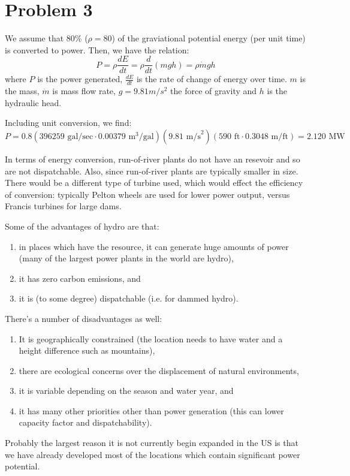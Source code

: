 \documentclass{homework}
\begin{document}
\section{Problem 3}

\begin{letterenum}
\item We assume that 80\% ($\rho = 80$) of the graviational potential energy
    (per unit time) is converted to power. Then, we have the relation:
    \begin{equation*}
        P = \rho \frac{dE}{dt} = \rho \frac{d}{dt}(mgh) = \rho \dot{m}gh
    \end{equation*}
    where $P$ is the power generated, $\frac{dE}{dt}$ is the rate of change
    of energy over time. $m$ is the mass, $\dot{m}$ is mass flow rate, $g=9.81m/s^2$
    the force of gravity and $h$ is the hydraulic head.

    Including unit conversion, we find:
    \begin{equation*}
        P = 0.8 (396259 \text{ gal/sec} \cdot 0.00379 \text{ m}^3\text{/gal})
            (9.81 \text{ m/s}^2) (590 \text{ ft} \cdot 0.3048 \text{ m/ft})
            = \boxed{2.120 \text{ MW}}
    \end{equation*}

\item In terms of energy conversion, run-of-river plants do not have an
    resevoir and so are not dispatchable. Also, since run-of-river plants
    are typically smaller in size. There would be a different
    type of turbine used, which would effect the efficiency of conversion:
    typically Pelton wheels are used for lower power output, versus
    Francis turbines for large dams.
\item Some of the advantages of hydro are that:
\begin{enumerate}
    \item in places which have the resource, it can generate huge amounts
        of power (many of the largest power plants in the world are hydro),
    \item it has zero carbon emissions, and
    \item it is (to some degree) dispatchable (i.e. for dammed hydro).
\end{enumerate}
There's a number of disadvantages as well:
\begin{enumerate}
    \item It is geographically constrained (the location needs to have
        water and a height difference such as mountains),
    \item there are ecological concerns over the displacement of natural
        environments,
    \item it is variable depending on the season and water year, and
    \item it has many other priorities other than power generation (this can
        lower capacity factor and dispatchability).
\end{enumerate}
Probably the largest reason it is not currently begin expanded in the US
is that we have already developed most of the locations which contain
significant power potential. 

\end{letterenum}
\end{document}
